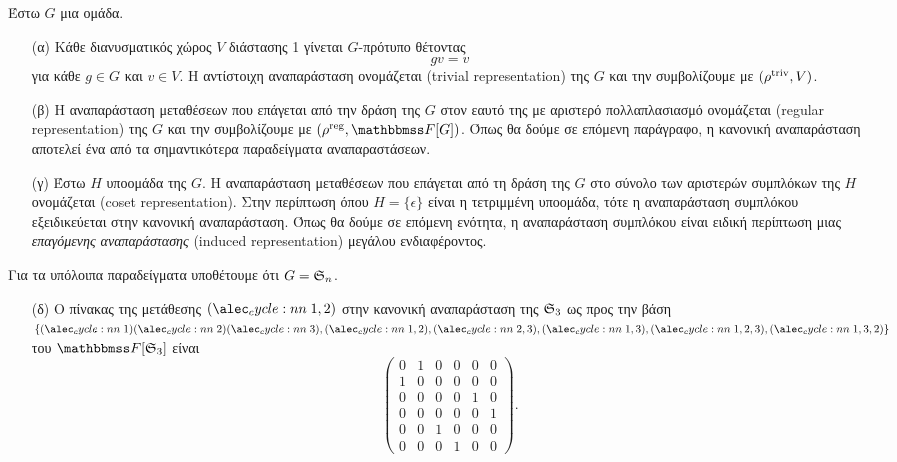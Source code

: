 \documentclass[12pt,a4paper,reqno]{amsart}
\newcommand{\defn}[1]{{\color{mylightblue}{#1}}}
\begin{document}
\begin{example}
    \label{ex:representations_examples}
    Έστω $G$ μια ομάδα.
    \leavevmode
    \begin{itemize}
        \item[(α)] Κάθε διανυσματικός χώρος $V$ διάστασης 1 γίνεται $G$-πρότυπο θέτοντας 
        \[
        gv = v
        \]
        για κάθε $g \in G$ και $v \in V$. Η αντίστοιχη αναπαράσταση ονομάζεται \defn{τετριμμένη αναπαράσταση} (trivial representation) της $G$ και την συμβολίζουμε με $(\rho^{\mathrm{triv}}, V)$.
        \item[(β)] Η αναπαράσταση μεταθέσεων που επάγεται από την δράση της $G$ στον εαυτό της με αριστερό πολλαπλασιασμό ονομάζεται \defn{κανονική αναπαράσταση} (regular representation) της $G$ και την συμβολίζουμε με $(\rho^\reg, \FF[G])$. Όπως θα δούμε σε επόμενη παράγραφο, η κανονική αναπαράσταση αποτελεί ένα από τα σημαντικότερα παραδείγματα αναπαραστάσεων.
        \item[(γ)] Έστω $H$ υποομάδα της $G$. Η αναπαράσταση μεταθέσεων που επάγεται από τη δράση της $G$ στο σύνολο των αριστερών συμπλόκων της $H$ ονομάζεται \defn{αναπαράσταση συμπλόκου} (coset representation). Στην περίπτωση όπου $H = \{\epsilon\}$ είναι η τετριμμένη υποομάδα, τότε η αναπαράσταση συμπλόκου εξειδικεύεται στην κανονική αναπαράσταση. Όπως θα δούμε σε επόμενη ενότητα, η αναπαράσταση συμπλόκου είναι ειδική περίπτωση μιας \emph{επαγόμενης αναπαράστασης} (induced representation) μεγάλου ενδιαφέροντος.
    \end{itemize}
    Για τα υπόλοιπα παραδείγματα υποθέτουμε ότι $G = \mathfrak{S}_n$.
    \begin{itemize}
        \item[(δ)] Ο πίνακας της μετάθεσης $\cycle{1,2}$ στην κανονική αναπαράσταση της $\mathfrak{S}_3$ ως προς την βάση $\{\cycle{1}\cycle{2}\cycle{3}, 
        \cycle{1,2}, 
        \cycle{2,3}, 
        \cycle{1,3}, 
        \cycle{1,2,3}, 
        \cycle{1,3,2}\}$ του $\FF[\fS_3]$ είναι   
        \[
        \begin{pmatrix}
            0 & 1 & 0 & 0 & 0 & 0 \\
            1 & 0 & 0 & 0 & 0 & 0 \\
            0 & 0 & 0 & 0 & 1 & 0 \\
            0 & 0 & 0 & 0 & 0 & 1 \\
            0 & 0 & 1 & 0 & 0 & 0 \\
            0 & 0 & 0 & 1 & 0 & 0
        \end{pmatrix}.
        \]

\end{itemize}
\end{example}
\end{document}
